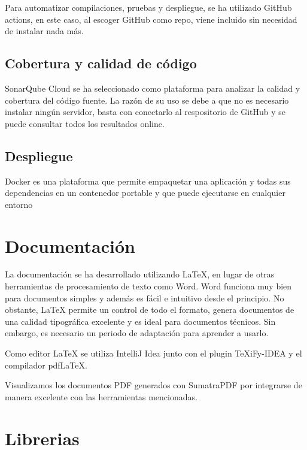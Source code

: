 Para automatizar compilaciones, pruebas y despliegue, se ha utilizado GitHub actions\cite{github:actions}, en este caso, al
escoger GitHub como repo, viene incluido sin necesidad de instalar nada más.

\subsection{Cobertura y calidad de código}\label{subsec:cobertura}

SonarQube Cloud\cite{sonarcloud:official} se ha seleccionado como plataforma para analizar la calidad y cobertura del código fuente.
La razón de su uso se debe a que no es necesario instalar ningún servidor, basta con conectarlo al respositorio de GitHub y
se puede consultar todos los resultados online.

\subsection{Despliegue}\label{subsec:despliegue}

Docker\cite{docker:official} es una plataforma que permite empaquetar una aplicación y todas sus dependencias en un
contenedor portable y que puede ejecutarse en cualquier entorno

\section{Documentación}\label{sec:documentacion}

La documentación se ha desarrollado utilizando LaTeX\cite{latex:official}, en lugar de otras herramientas de procesamiento de texto como Word.
Word funciona muy bien para documentos simples y además es fácil e intuitivo desde el principio.
No obstante, LaTeX permite un control de todo el formato, genera documentos de una calidad tipográfica
excelente y es ideal para documentos técnicos.
Sin embargo, es necesario un periodo de adaptación para aprender a usarlo.

Como editor LaTeX se utiliza IntelliJ Idea junto con el plugin TeXiFy-IDEA y el compilador pdfLaTeX.

Visualizamos los documentos PDF generados con SumatraPDF por integrarse de manera excelente con las herramientas
mencionadas.


\section{Librerias}\label{sec:librerias}

